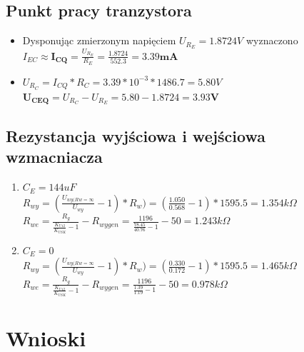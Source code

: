 \documentclass[a4paper,12pt]{article}
\begin{document}
\begin{figure}
\subsection{Punkt pracy tranzystora}

\begin{itemize}
 \item Dysponując zmierzonym napięciem $U_{R_E} = 1.8724V$ \newline
	wyznaczono $I_{EC} \approx \mathbf{I_{CQ}} = \frac{U_{R_E}}{R_E} = \frac{1.8724}{552.3} = \mathbf{3.39mA}$
  \item $U_{R_C} = I_{CQ}*R_C = 3.39 * 10^{-3} * 1486.7 = 5.80V$ \newline
	$\mathbf{U_{CEQ}} = U_{R_C} - U_{R_E} = 5.80  - 1.8724 = \mathbf{3.93V}$

\end{itemize}

\subsection{Rezystancja wyjściowa i wejściowa wzmacniacza}
\begin{enumerate}
 \item $C_E = 144uF$ \newline
	$R_{wy} = (\frac{U_{wy(Rw=\infty}}{U_{wy}}-1) * R_{w}) = (\frac{1.050}{0.568}-1)*1595.5 = 1.354k\Omega$ \newline
	$R_{we} = \frac{R_g}{\frac{K_{U12}}{K_{USK}}-1} - R_{wygen} = \frac{1196}{\frac{78.45}{40.76}-1} - 50 = 1.243 k\Omega$
  \item $C_E = 0$ \newline
	$R_{wy} = (\frac{U_{wy(Rw=\infty}}{U_{wy}}-1) * R_{w}) = (\frac{0.330}{0.172}-1)*1595.5 = 1.465k\Omega$ \newline
	$R_{we} = \frac{R_g}{\frac{K_{U12}}{K_{USK}}-1} - R_{wygen} = \frac{1196}{\frac{1.39}{1.19}-1} - 50 = 0.978k\Omega$
\end{enumerate}


\section {Wnioski}


\end{figure}
\end{document}

